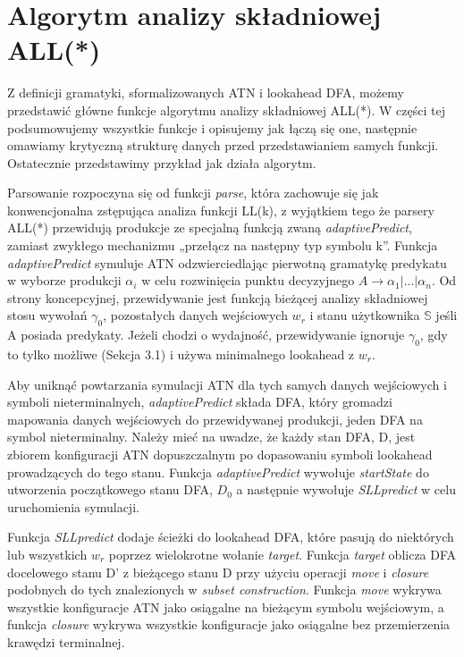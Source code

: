 \section{Algorytm analizy składniowej ALL(*)}
Z definicji gramatyki, sformalizowanych ATN i lookahead DFA, możemy przedstawić główne funkcje
algorytmu analizy składniowej ALL(*).
W części tej podsumowujemy wszystkie funkcje i opisujemy jak łączą się one, następnie omawiamy
krytyczną strukturę danych przed przedstawianiem samych funkcji. Ostatecznie przedstawimy
przykład jak działa algorytm.
\par
Parsowanie rozpoczyna się od funkcji \textit{parse}, która zachowuje się jak konwencjonalna
zstępująca analiza funkcji LL(k), z wyjątkiem tego że parsery ALL(*) przewidują
produkcje ze specjalną funkcją zwaną \textit{adaptivePredict},
zamiast zwykłego mechanizmu „przełącz na następny typ symbolu k”.
Funkcja \textit{adaptivePredict} symuluje ATN odzwierciedlając pierwotną gramatykę
predykatu w wyborze produkcji $\alpha_i$ w celu rozwinięcia punktu decyzyjnego
$A \rightarrow \alpha_1 | ... | \alpha_n$.
Od strony koncepcyjnej, przewidywanie jest funkcją bieżącej analizy składniowej stosu wywołań
$\gamma_0$, pozostałych danych wejściowych $w_r$ i stanu użytkownika $\mathbb{S}$ jeśli A posiada predykaty.
Jeżeli chodzi o wydajność, przewidywanie ignoruje $\gamma_0$, gdy to tylko możliwe (Sekcja 3.1)
i używa minimalnego lookahead z $w_r$.
\par
Aby uniknąć powtarzania symulacji ATN dla tych samych danych wejściowych i symboli nieterminalnych,
\textit{adaptivePredict} składa DFA, który gromadzi mapowania danych wejściowych do przewidywanej produkcji,
jeden DFA na symbol nieterminalny.
Należy mieć na uwadze, że każdy stan DFA, D, jest zbiorem konfiguracji ATN dopuszczalnym po dopasowaniu
symboli lookahead prowadzących do tego stanu.
Funkcja \textit{adaptivePredict} wywołuje \textit{startState} do utworzenia początkowego stanu DFA,
\( D_0 \) a następnie wywołuje \textit{SLLpredict} w celu uruchomienia symulacji.
\par
Funkcja \textit{SLLpredict} dodaje ścieżki do lookahead DFA, które pasują do niektórych lub wszystkich
$w_r$ poprzez wielokrotne wołanie \textit{target}. Funkcja \textit{target} oblicza DFA docelowego stanu D'
z bieżącego stanu D przy użyciu operacji \textit{move} i \textit{closure} podobnych do tych
znalezionych w \textit{subset construction}.
Funkcja \textit{move} wykrywa wszystkie konfiguracje ATN jako osiągalne na bieżącym symbolu wejściowym,
a funkcja \textit{closure} wykrywa wszystkie konfiguracje jako osiągalne bez przemierzenia krawędzi terminalnej.
